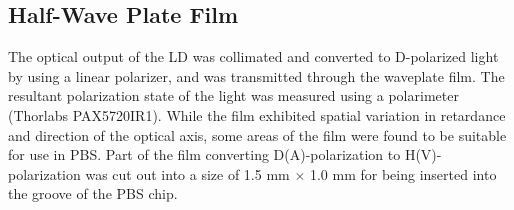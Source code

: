 \documentclass[letterpaper, 10pt]{article}
\begin{document}
\subsection{Half-Wave Plate Film}
The optical output of the LD  was collimated and converted to D-polarized light by using a linear polarizer, and was transmitted through the waveplate film.
The resultant polarization state of the light was measured using a polarimeter (Thorlabs PAX5720IR1).
While the film exhibited spatial variation in retardance and direction of the optical axis, some areas of the film were found to be suitable for use in PBS.
Part of the film converting D(A)-polarization to H(V)-polarization was cut out into a size of 1.5 mm $\times$ 1.0 mm for being inserted into the groove of the PBS chip.
\end{document}
